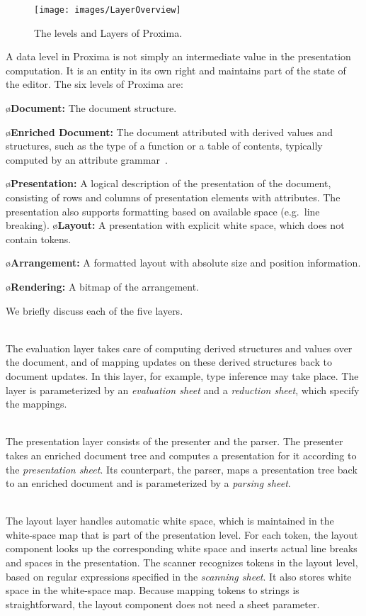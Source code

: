 \documentclass{article}[10pt]
\begin{document}
\begin{figure}[ht]
\centering
\texttt{[image: images/LayerOverview]}
\caption{The levels and Layers of Proxima.}
\label{fig:levelsAndLayers}
\end{figure}

A data level in Proxima is not simply an intermediate value in the presentation computation. It is an entity in its own right and maintains part of the state of the editor. The six levels of Proxima are:


\bl
\o {\bf Document:} The document structure.

\o {\bf Enriched Document:} The document attributed with derived values and structures, such as the type of a function or a table of contents, typically computed by an attribute grammar~\cite{reps84synGen}.

\o{\bf Presentation:} A logical description of the presentation of the document, consisting of rows and columns of presentation elements with attributes. The presentation also supports formatting based on available space (e.g.\ line breaking).
\pagebreak
\o{\bf Layout:} A presentation with explicit white space, which does not contain tokens.

\o{\bf Arrangement:} A formatted layout with absolute size and position information.

\o{\bf Rendering:} A bitmap of the arrangement.
\el


\bc
We briefly discuss each of the five layers.

\\
The evaluation layer takes care of computing derived structures and values over the document, and of mapping updates on these derived structures back to document updates. In this layer, for example, type inference may take place. The layer is parameterized by an {\em evaluation sheet} and a {\em reduction sheet}, which specify the mappings. 

\\
The presentation layer consists of the presenter and the parser. The presenter takes an enriched document tree and computes a presentation for it according to the {\em presentation sheet}. Its counterpart, the parser, maps a presentation tree back to an enriched document and is parameterized by a {\em parsing sheet}.

\\
The layout layer handles automatic white space, which is maintained in the white-space map that is part of the presentation level. For each token, the layout component looks up the corresponding white space and inserts actual line breaks and spaces in the presentation. The scanner recognizes tokens in the layout level, based on regular expressions specified in the {\em scanning sheet}. It also stores white space in the white-space map. Because mapping tokens to strings is straightforward, the layout component does not need a sheet parameter.
\end{document}
